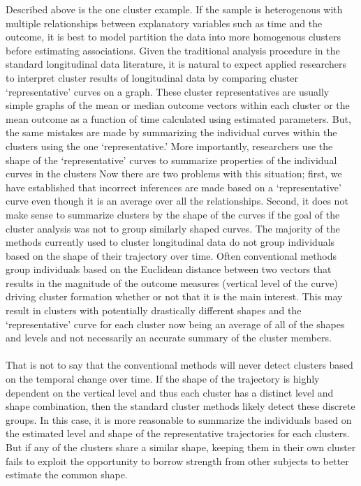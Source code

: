 \documentclass[12pt]{article}
\begin{document}
Described above is the one cluster example. If the sample is heterogenous with multiple relationships between explanatory variables such as time and the outcome, it is best to model partition the data into more homogenous clusters before estimating associations. Given the traditional analysis procedure in the standard longitudinal data literature, it is natural to expect applied researchers to interpret cluster results of longitudinal data by comparing cluster `representative' curves on a graph. These cluster representatives are usually simple graphs of the mean or median outcome vectors within each cluster or the mean outcome as a function of time calculated using estimated parameters. But, the same mistakes are made by summarizing the individual curves within the clusters using the one `representative.' More importantly, researchers use the shape of the `representative' curves to summarize properties of the individual curves in the clusters \cite{windle2004,mulvaney2006,broadbent2008,pryor2011,mccoy2010} Now there are two problems with this situation; first, we have established that incorrect inferences are made based on a `representative' curve  even though it is an average over all the relationships. Second, it does not make sense to summarize clusters by the shape of the curves if the goal of the cluster analysis was not to group similarly shaped curves. The majority of the methods currently used to cluster longitudinal data do not group individuals based on the shape of their trajectory over time. Often conventional methods group individuals based on the Euclidean distance between two vectors that results in the magnitude of the outcome measures (vertical level of the curve) driving cluster formation whether or not that it is the main interest. This may result in clusters with potentially drastically different shapes and the `representative' curve for each cluster now being an average of all of the shapes and levels and not necessarily an accurate summary of the cluster members. \\\\
That is not to say that the conventional methods will never detect clusters based on the temporal change over time. If the shape of the trajectory is highly dependent on the vertical level and thus each cluster has a distinct level and shape combination, then the standard cluster methods likely detect these discrete groups. In this case, it is more reasonable to summarize the individuals based on the estimated level and shape of the representative trajectories for each clusters. But if any of the clusters share a similar shape, keeping them in their own cluster fails to exploit the opportunity to borrow strength from other subjects to better estimate the common shape.\\\\
\end{document}
